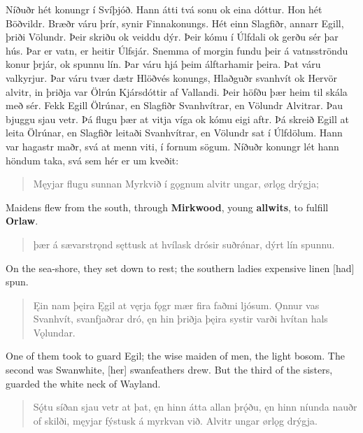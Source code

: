 
Níðuðr hét konungr í Svíþjóð. Hann átti tvá sonu ok eina dóttur. Hon hét Böðvildr. Bræðr váru þrír, synir Finnakonungs. Hét einn Slagfiðr, annarr Egill, þriði Völundr. Þeir skriðu ok veiddu dýr. Þeir kómu í Úlfdali ok gerðu sér þar hús. Þar er vatn, er heitir Úlfsjár. Snemma of morgin fundu þeir á vatnsströndu konur þrjár, ok spunnu lín. Þar váru hjá þeim álftarhamir þeira. Þat váru valkyrjur. Þar váru tvær dætr Hlöðvés konungs, Hlaðguðr svanhvít ok Hervör alvitr, in þriðja var Ölrún Kjársdóttir af Vallandi. Þeir höfðu þær heim til skála með sér. Fekk Egill Ölrúnar, en Slagfiðr Svanhvítrar, en Völundr Alvitrar. Þau bjuggu sjau vetr. Þá flugu þær at vitja víga ok kómu eigi aftr. Þá skreið Egill at leita Ölrúnar, en Slagfiðr leitaði Svanhvítrar, en Völundr sat í Úlfdölum. Hann var hagastr maðr, svá at menn viti, í fornum sögum. Níðuðr konungr lét hann höndum taka, svá sem hér er um kveðit: \\%

\begin{verse}
\bva Męyjar flugu sunnan \hld Myrkvið í gǫgnum
alvitr ungar, \hld ørlǫg drýgja; \\%
\end{verse}

\bvb Maidens flew from the south, through \textbf{Mirkwood}, young \textbf{allwits}, to fulfill \textbf{Orlaw}.

\begin{verse}
\bva þær á sævarstrǫnd \hld sęttusk at hvílask
drósir suðrǿnar, \hld dýrt lín spunnu. \\%
\end{verse}

\bvb On the sea-shore, they set down to rest; the southern ladies expensive linen [had] spun.

\begin{verse}
\bva Ęin nam þęira \hld Ęgil at vęrja
fǫgr mær fira \hld faðmi ljósum.
Ǫnnur vas Svanhvít, \hld svanfjaðrar dró,
ęn hin þriðja \hld þęira systir
varði hvítan \hld hals Vǫlundar. \\%
\end{verse}

\bvb One of them took to guard Egil; the wise maiden of men, the light bosom. The second was Swanwhite, [her] swanfeathers drew. But the third of the sisters, guarded the white neck of Wayland.

\begin{verse}
\bva Sǫ́tu síðan \hld sjau vetr at þat,
ęn hinn átta \hld allan þrǫ́ðu,
ęn hinn níunda \hld nauðr of skilði,
męyjar fýstusk \hld á myrkvan við.
Alvitr ungar \hld ørlǫg drýgja. \\%
\end{verse}

